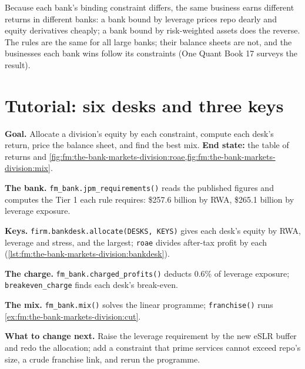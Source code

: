 \begin{remark}\label{rem:fm:the-bank-markets-division:special}
Because each bank's binding constraint differs, the same business earns different returns in different banks: a bank bound by leverage prices repo
dearly and equity derivatives cheaply; a bank bound by risk-weighted assets does the reverse. The rules are the same for all large banks; their
balance sheets are not, and the businesses each bank wins follow its constraints (One Quant Book 17 surveys the result).
\end{remark}

\section{Tutorial: six desks and three keys}\label{tut:fm:the-bank-markets-division:tut}

\begin{tutorial}
\textbf{Goal.} Allocate a division's equity by each constraint, compute each desk's return, price the balance sheet, and find the best mix.
\textbf{End state:} the table of returns and \cref{fig:fm:the-bank-markets-division:roae,fig:fm:the-bank-markets-division:mix}.
\begin{tutsteps}
\item \textbf{The bank.} \texttt{fm\_bank.jpm\_requirements()} reads the published figures and computes the Tier 1 each rule requires:
\$257.6 billion by RWA, \$265.1 billion by leverage exposure.
\item \textbf{Keys.} \texttt{firm.bankdesk.allocate(DESKS, KEYS)} gives each desk's equity by RWA, leverage and stress, and the largest;
\texttt{roae} divides after-tax profit by each (\cref{lst:fm:the-bank-markets-division:bankdesk}).
\item \textbf{The charge.} \texttt{fm\_bank.charged\_profits()} deducts 0.6\% of leverage exposure; \texttt{breakeven\_charge} finds each desk's
break-even.
\item \textbf{The mix.} \texttt{fm\_bank.mix()} solves the linear programme; \texttt{franchise()} runs \cref{ex:fm:the-bank-markets-division:cut}.
\end{tutsteps}
\end{tutorial}

\textbf{What to change next.} Raise the leverage requirement by the new eSLR buffer and redo the allocation; add a constraint that prime services
cannot exceed repo's size, a crude franchise link, and rerun the programme.

